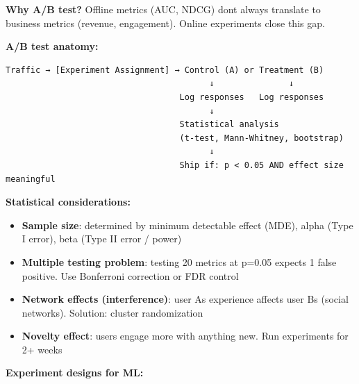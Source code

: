 \documentclass[11pt]{article}
\providecommand{\tightlist}{\setlength{\itemsep}{1pt}\setlength{\parskip}{0pt}}
\begin{document}
\textbf{Why A/B test?} Offline metrics (AUC, NDCG) don\textquotesingle t always translate to business metrics (revenue, engagement). Online experiments close this gap.

\textbf{A/B test anatomy:}

\setcodelang{}

\begin{verbatim}
Traffic → [Experiment Assignment] → Control (A) or Treatment (B)
                                         ↓               ↓
                                   Log responses   Log responses
                                         ↓
                                   Statistical analysis
                                   (t-test, Mann-Whitney, bootstrap)
                                         ↓
                                   Ship if: p < 0.05 AND effect size meaningful
\end{verbatim}

\textbf{Statistical considerations:}

\begin{itemize}
\tightlist
\item
  \textbf{Sample size}: determined by minimum detectable effect (MDE), alpha (Type I error), beta (Type II error / power)
\item
  \textbf{Multiple testing problem}: testing 20 metrics at p=0.05 expects 1 false positive. Use Bonferroni correction or FDR control
\item
  \textbf{Network effects (interference)}: user A\textquotesingle s experience affects user B\textquotesingle s (social networks). Solution: cluster randomization
\item
  \textbf{Novelty effect}: users engage more with anything new. Run experiments for 2+ weeks
\end{itemize}

\textbf{Experiment designs for ML:}
\end{document}
